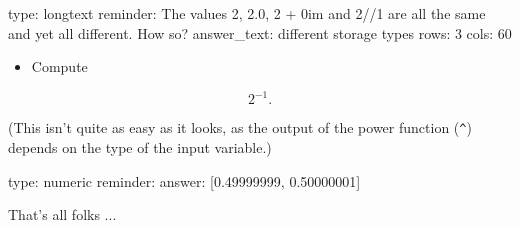 \documentclass[12pt]{article}
\begin{document}
\begin{answer}
type: longtext
reminder: The values 2, 2.0, 2 + 0im and 2//1 are all the same and yet all different. How so?
answer_text: different storage types 
rows: 3
cols: 60
\end{answer}

\begin{itemize}
\itemsep1pt\parskip0pt
\item
  Compute
\end{itemize}

\[
2^{-1}.
\]

(This isn't quite as easy as it looks, as the output of the power
function (\texttt{\^{}}) depends on the type of the input variable.)

\begin{answer}
    type: numeric
    reminder: 
    answer: [0.49999999, 0.50000001]

\end{answer}

That's all folks ...
\end{document}

